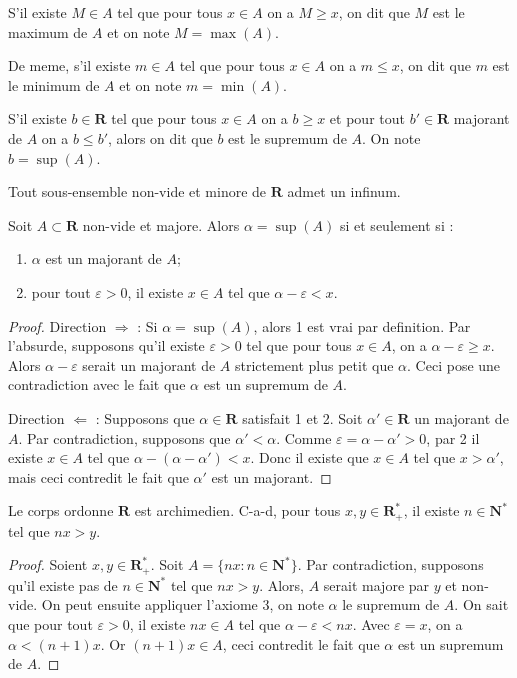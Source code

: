 \begin{definition}
S'il existe $M\in A$ tel que pour tous $x \in A$ on a $M\ge x$, on dit que $M$ est le maximum de $A$ et on note $M=\max(A)$.

De meme, s'il existe $m\in A$ tel que pour tous $x \in A$ on a $m\le x$, on dit que $m$ est le minimum de $A$ et on note $m=\min(A)$.
\end{definition}
\begin{definition}[Supremum]
S'il existe $b\in \mathbf{R}$ tel que pour tous $x \in A$ on a $b\ge x$ et pour tout $b'\in \mathbf{R}$ majorant de $A$ on a $b\le b'$, alors on dit que $b$ est le supremum de $A$. On note $b=\sup(A)$.
\end{definition}
\begin{proposition}
Tout sous-ensemble non-vide et minore de $\mathbf{R}$ admet un infinum.
\end{proposition}
\begin{proposition}
Soit $A\subset \mathbf{R}$ non-vide et majore. Alors $\alpha=\sup(A)$ si et seulement si :
\begin{enumerate}
\item $\alpha$ est un majorant de $A$;
\item pour tout $\varepsilon>0$, il existe $x \in A$ tel que $\alpha -\varepsilon<x$.
\end{enumerate}
\end{proposition}
\begin{proof}
Direction $\Rightarrow$ : Si $\alpha=\sup(A)$, alors 1 est vrai par definition. Par l'absurde, supposons qu'il existe $\varepsilon>0$ tel que pour tous $x \in A$, on a $\alpha -\varepsilon \ge x$. Alors $\alpha -\varepsilon$ serait un majorant de $A$ strictement plus petit que $\alpha$. Ceci pose une contradiction avec le fait que $\alpha$ est un supremum de $A$.

Direction $\Leftarrow$ : Supposons que $\alpha \in \mathbf{R}$ satisfait 1 et 2. Soit $\alpha'\in \mathbf{R}$ un majorant de $A$. Par contradiction, supposons que $\alpha'<\alpha$. Comme $\varepsilon=\alpha -\alpha'>0$, par 2 il existe $x \in A$ tel que $\alpha-(\alpha -\alpha')<x$. Donc il existe que $x \in A$ tel que $x>\alpha'$, mais ceci contredit le fait que $\alpha'$ est un majorant.
\end{proof}

\begin{theorem}
Le corps ordonne $\mathbf{R}$ est archimedien. C-a-d, pour tous $x,y\in \mathbf{R}_{+}^{*}$, il existe $n\in \mathbf{N}^{*}$ tel que $nx>y$.
\end{theorem}
\begin{proof}
Soient $x,y\in \mathbf{R}_{+}^{*}$. Soit $A=\{ nx:n\in \mathbf{N}^{*} \}$. Par contradiction, supposons qu'il existe pas de $n\in \mathbf{N}^{*}$ tel que $nx>y$. Alors, $A$ serait majore par $y$ et non-vide. On peut ensuite appliquer l'axiome 3, on note $\alpha$ le supremum de $A$. On sait que pour tout $\varepsilon>0$, il existe $nx \in A$ tel que $\alpha-\varepsilon<nx$. Avec $\varepsilon=x$, on a $\alpha<(n+1)x$. Or $(n+1)x \in A$, ceci contredit le fait que $\alpha$ est un supremum de $A$.
\end{proof}